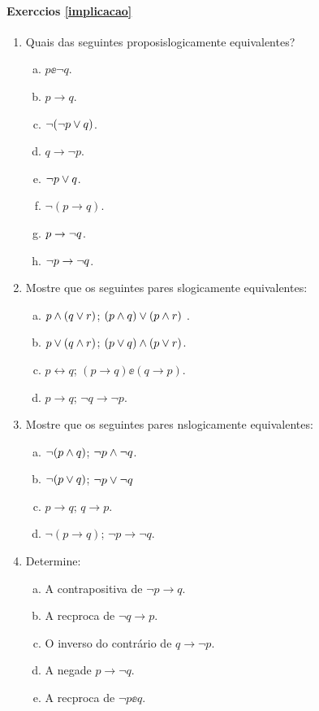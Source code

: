 \paragraph{Exerc\ih cios \ref{implicacao}}

\begin{enumerate}[{\bf 1.}]
\item Quais das seguintes proposi\coes s\ao logicamente equivalentes?
\begin{enumerate}[a)]
\item $p \ee \lnot q$.
\item $p \to q$.
\item $\lnot(\lnot p \vee q)$.
\item $q \to \lnot p$.
\item $\lnot p \vee q$.
\item $\lnot (p \to q)$.
\item $p \to \lnot q$.
\item $\lnot p \to \lnot q$.
\end{enumerate}

\item Mostre que os seguintes pares s\ao logicamente equivalentes:
\begin{enumerate}[a)]
\item $p\wedge(q\vee r)$; $(p\wedge q)\vee(p\wedge r)$ .
\item $p\vee(q\wedge r)$; $(p\vee q)\wedge(p\vee r)$.
\item $p\leftrightarrow q$; $(p \to q)\ee(q \to p)$.
\item $p \to q$; $\lnot q \to \lnot p$.
\end{enumerate}

\item Mostre que os seguintes pares n\ao s\ao logicamente equivalentes:
\begin{enumerate}[a)]
\item $\lnot(p \wedge q)$; $\lnot p \wedge \lnot q$.
\item $\lnot(p \vee q)$; $\lnot p \vee \lnot q$
\item $p \to q$; $q \to p$.
\item $\lnot (p \to q)$; $\lnot p \to \lnot q$.
\end{enumerate}

\item Determine:
\begin{enumerate}[a)]
\item A contrapositiva de $\lnot p\to q$.
\item A rec\ih proca de $\lnot q \to p$.
\item O inverso do contr\'ario de $q \to \lnot p$.
\item A nega\cao de $p \to \lnot q$.
\item A rec\ih proca de $\lnot p \ee q$.
\end{enumerate}


\end{enumerate}
